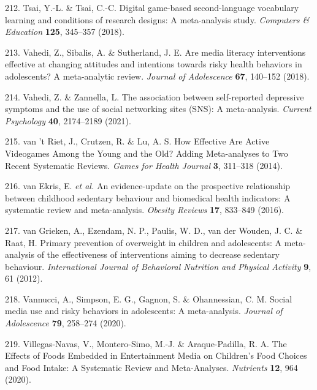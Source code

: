 \documentclass[
  english,
  man]{apa6}
\newenvironment{cslreferences}%
  {}%
  {\par}
\begin{document}
\begin{cslreferences}
\leavevmode\hypertarget{ref-tsaiDigitalGamebasedSecondlanguage2018}{}%
212. Tsai, Y.-L. \& Tsai, C.-C. Digital game-based second-language vocabulary learning and conditions of research designs: A meta-analysis study. \emph{Computers \& Education} \textbf{125}, 345--357 (2018).

\leavevmode\hypertarget{ref-vahediAreMediaLiteracy2018}{}%
213. Vahedi, Z., Sibalis, A. \& Sutherland, J. E. Are media literacy interventions effective at changing attitudes and intentions towards risky health behaviors in adolescents? A meta-analytic review. \emph{Journal of Adolescence} \textbf{67}, 140--152 (2018).

\leavevmode\hypertarget{ref-vahediAssociationSelfreportedDepressive2021}{}%
214. Vahedi, Z. \& Zannella, L. The association between self-reported depressive symptoms and the use of social networking sites (SNS): A meta-analysis. \emph{Current Psychology} \textbf{40}, 2174--2189 (2021).

\leavevmode\hypertarget{ref-vantrietHowEffectiveAre2014}{}%
215. van 't Riet, J., Crutzen, R. \& Lu, A. S. How Effective Are Active Videogames Among the Young and the Old? Adding Meta-analyses to Two Recent Systematic Reviews. \emph{Games for Health Journal} \textbf{3}, 311--318 (2014).

\leavevmode\hypertarget{ref-vanekrisEvidenceupdateProspectiveRelationship2016}{}%
216. van Ekris, E. \emph{et al.} An evidence-update on the prospective relationship between childhood sedentary behaviour and biomedical health indicators: A systematic review and meta-analysis. \emph{Obesity Reviews} \textbf{17}, 833--849 (2016).

\leavevmode\hypertarget{ref-vangriekenPrimaryPreventionOverweight2012}{}%
217. van Grieken, A., Ezendam, N. P., Paulis, W. D., van der Wouden, J. C. \& Raat, H. Primary prevention of overweight in children and adolescents: A meta-analysis of the effectiveness of interventions aiming to decrease sedentary behaviour. \emph{International Journal of Behavioral Nutrition and Physical Activity} \textbf{9}, 61 (2012).

\leavevmode\hypertarget{ref-vannucciSocialMediaUse2020}{}%
218. Vannucci, A., Simpson, E. G., Gagnon, S. \& Ohannessian, C. M. Social media use and risky behaviors in adolescents: A meta-analysis. \emph{Journal of Adolescence} \textbf{79}, 258--274 (2020).

\leavevmode\hypertarget{ref-villegas-navasEffectsFoodsEmbedded2020}{}%
219. Villegas-Navas, V., Montero-Simo, M.-J. \& Araque-Padilla, R. A. The Effects of Foods Embedded in Entertainment Media on Children's Food Choices and Food Intake: A Systematic Review and Meta-Analyses. \emph{Nutrients} \textbf{12}, 964 (2020).


\end{cslreferences}
\end{document}
